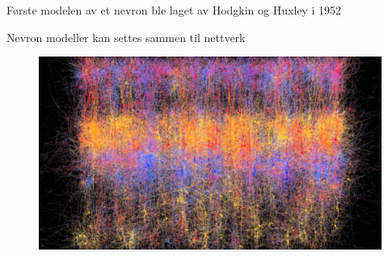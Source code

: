 \documentclass[presentation]{beamer}
\begin{document}
\begin{frame}{Første modelen av et nevron ble laget av Hodgkin og Huxley i 1952}
   \begin{figure}
\end{figure}
\end{frame}


\begin{frame}{Nevron modeller kan settes sammen til nettverk}
   \begin{figure}
     {\includegraphics[width=1\textwidth]{network_large.jpg}}
\end{figure}
\end{frame}
\end{document}
